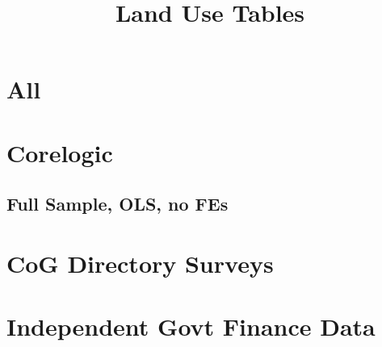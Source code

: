 \documentclass{article}
\title{Land Use Tables}
\begin{document}
\maketitle
\tableofcontents
{\footnotesize 
\listoffigures
\listoftables}
\clearpage


\begin{landscape}

\section{All}

\clearpage

\clearpage


\clearpage

\clearpage


\section{Corelogic}
\subsection{Full Sample, OLS, no FEs}

\clearpage

\clearpage

\section{CoG Directory Surveys}

\clearpage

\clearpage

\section{Independent Govt Finance Data}

\clearpage

\clearpage

\end{landscape}
\end{document}
